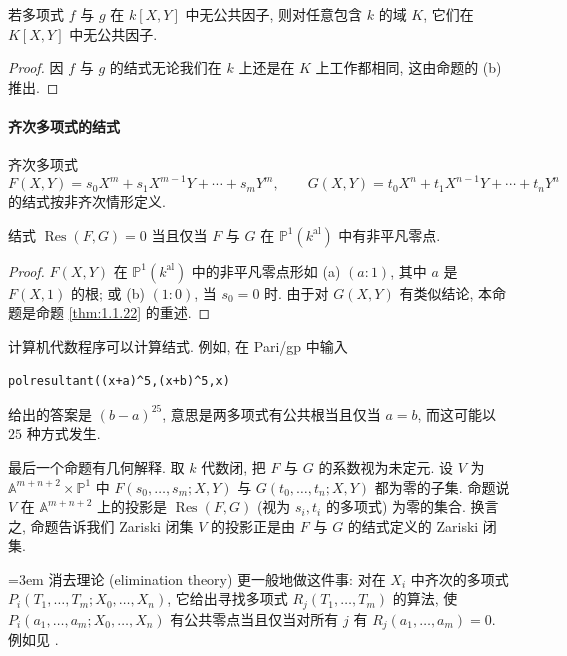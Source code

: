 \begin{corollary} \label{thm:1.1.25} 
若多项式 $f$ 与 $g$ 在 $k[X,Y]$ 中无公共因子, 则对任意包含 $k$ 的域 $K$, 它们在 $K[X,Y]$ 中无公共因子.
\end{corollary}

\begin{proof}
因 $f$ 与 $g$ 的结式无论我们在 $k$ 上还是在 $K$ 上工作都相同, 这由命题的 (b) 推出.
\end{proof}

\paragraph{齐次多项式的结式}
齐次多项式
\[
F(X,Y) = s_0X^m + s_1X^{m-1}Y + \cdots + s_mY^m, \qquad
G(X,Y) = t_0X^n + t_1X^{n-1}Y + \cdots + t_nY^n
\]
的结式按非齐次情形定义.

\begin{proposition} \label{thm:1.1.26} 
结式 $\operatorname{Res}(F,G) = 0$ 当且仅当 $F$ 与 $G$ 在 $\mathbb{P}^1(k^{\mathrm{al}})$ 中有非平凡零点.
\end{proposition}

\begin{proof}
$F(X,Y)$ 在 $\mathbb{P}^1(k^{\mathrm{al}})$ 中的非平凡零点形如 (a) $(a:1)$, 其中 $a$ 是 $F(X,1)$ 的根; 或 (b) $(1:0)$, 当 $s_0 = 0$ 时. 由于对 $G(X,Y)$ 有类似结论, 本命题是命题 \ref{thm:1.1.22} 的重述.
\end{proof}

计算机代数程序可以计算结式. 例如, 在 Pari/gp 中输入
\begin{verbatim}
polresultant((x+a)^5,(x+b)^5,x)
\end{verbatim}
给出的答案是 $(b-a)^{25}$, 意思是两多项式有公共根当且仅当 $a = b$, 而这可能以 $25$ 种方式发生.

\begin{aside} \label{thm:1.1.27} 
最后一个命题有几何解释. 取 $k$ 代数闭, 把 $F$ 与 $G$ 的系数视为未定元. 设 $V$ 为 $\mathbb{A}^{m+n+2}\times\mathbb{P}^1$ 中 $F(s_0,\dots,s_m;X,Y)$ 与 $G(t_0,\dots,t_n;X,Y)$ 都为零的子集. 命题说 $V$ 在 $\mathbb{A}^{m+n+2}$ 上的投影是 $\operatorname{Res}(F,G)$ (视为 $s_i, t_i$ 的多项式) 为零的集合. 换言之, 命题告诉我们 Zariski 闭集 $V$ 的投影正是由 $F$ 与 $G$ 的结式定义的 Zariski 闭集.

{\emergencystretch=3em 消去理论 (elimination theory) 更一般地做这件事: 对在 $X_i$ 中齐次的多项式 $P_i(T_1,\dots,T_m;\allowbreak X_0,\dots,X_n)$, 它给出寻找多项式 $R_j(T_1,\dots,T_m)$ 的算法, 使 $P_i(a_1,\dots,a_m;\allowbreak X_0,\dots,X_n)$ 有公共零点当且仅当对所有 $j$ 有 $R_j(a_1,\dots,a_m) = 0$. 例如见 \cite[Chap. 8, \S5]{cox2007}.\par}
\end{aside}


